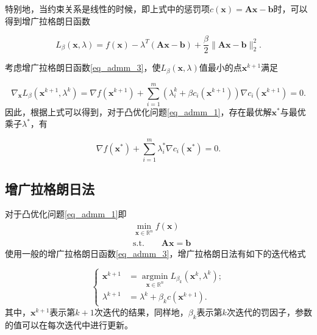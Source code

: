 特别地，当约束关系是线性的时候，即上式中的惩罚项$c(\bm{x})=\bm{Ax}-\bm{b}$时，可以得到增广拉格朗日函数

\begin{equation}
    L_{\beta}(\bm{x}, \lambda) = f(\bm{x}) - \lambda^{T}(\bm{Ax}-\bm{b})+\frac{\beta}{2}\|\bm{Ax}-\bm{b}\|_{2}^{2}.
    \label{eq_admm_4}
\end{equation}

考虑增广拉格朗日函数\ref{eq_admm_3}，使$L_{\beta}(\bm{x}, \lambda)$值最小的点$\bm{x}^{k+1}$满足\cite{2016ADMM}

\begin{equation*}
    \nabla_{\bm{x}} L_{\beta}(\bm{x}^{k+1}, \lambda^{k}) = \nabla f(\bm{x}^{k+1}) + \sum_{i=1}^{m} (\lambda_{i}^{k}+\beta c_{i}(\bm{x}^{k+1})) \nabla c_{i}(\bm{x}^{k+1}) = 0.
\end{equation*}
因此，根据上式可以得到，对于凸优化问题\ref{eq_admm_1}，存在最优解$\bm{x}^{*}$与最优乘子$\lambda^{*}$，有

\begin{equation}
    \nabla f(\bm{x}^{*}) + \sum_{i=1}^{m}\lambda_{i}^{*}\nabla c_{i}(\bm{x}^{*}) = 0.
\end{equation}

\subsection{增广拉格朗日法}

对于凸优化问题\ref{eq_admm_1}即
\begin{equation*}
    \begin{split}
        &\min\limits_{\bm{x}\in \mathbb{R}^{n}} f(\bm{x}) \\
        &\mathrm{s. t.} \quad\quad \bm{Ax} = \bm{b}
    \end{split}
\end{equation*}
使用一般的增广拉格朗日函数\ref{eq_admm_3}，增广拉格朗日法有如下的迭代格式

\begin{equation}
    \begin{cases}
        \bm{x}^{k+1} &= \mathop{\mathrm{argmin}}\limits_{\bm{x}\in \mathbb{R}^{n}} L_{\beta_{k}}(\bm{x}^{k}, \lambda^{k}) ; \\
        \lambda^{k+1} &= \lambda^{k} + \beta_{k} c(\bm{x}^{k+1}) .
    \end{cases}
    \label{eq_admm_5}
\end{equation}
其中，$\bm{x}^{k+1}$表示第$k+1$次迭代的结果，同样地，$\beta_{k}$表示第$k$次迭代的罚因子，参数的值可以在每次迭代中进行更新。

